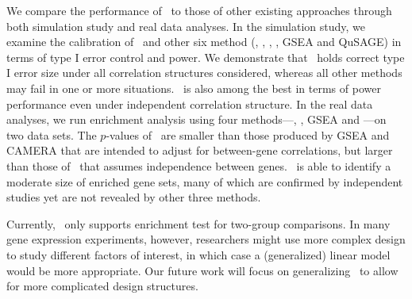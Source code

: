	We compare the performance of \OurMethod~to those of other existing approaches through both 
	simulation study and real data analyses. In the simulation study, we examine the calibration 
	of \OurMethod~and other six method (\gent, \genr, \CMT, \CMR, GSEA and QuSAGE) in terms of type 
	I error control and power. We demonstrate that \OurMethod~holds correct type I error size under 
	all correlation structures considered, whereas all other methods may fail in one or more 
	situations. \OurMethod~is also among the best in terms of power performance even under 
	independent correlation structure. In the real data analyses, we run enrichment analysis using 
	four methods---\OurMethod, \CMT, GSEA and \genr---on two data sets.
	The $p$-values of \OurMethod~are smaller than those produced by 
	 GSEA and CAMERA that are intended to adjust for between-gene correlations, but 
	 larger than those of \genr~that assumes independence between genes.
	 \OurMethod~is able to identify a moderate size of enriched gene sets, many of which are 
	 confirmed by independent studies yet are not revealed by other three methods.
	
	Currently, \OurMethod~only supports enrichment test for two-group comparisons. In
	many gene expression experiments, however, researchers might use more complex design to study
	different factors of interest, in which case a (generalized) linear model would be more 
	appropriate. Our
	future work will focus on generalizing \OurMethod~to allow for more complicated design 
	structures. 
	

